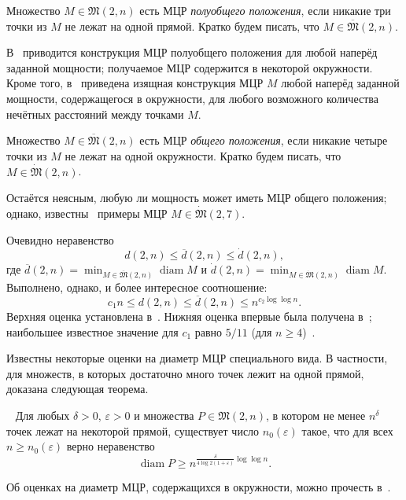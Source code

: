 \documentclass[11pt,twoside,draft
]{article}
\begin{document}
\begin{definition}
	Множество $M\in\mathfrak{M}(2,n)$ есть МЦР \textit{полуобщего положения},
	если никакие три точки из $M$ не лежат на одной прямой.
	Кратко будем писать, что $M\in \overline{\mathfrak{M}}(2,n)$.
\end{definition}

В~\cite{harborth1993upper} приводится конструкция МЦР полуобщего положения для любой наперёд заданной мощности;
получаемое МЦР содержится в некоторой окружности.
Кроме того, в~\cite{piepmeyer1996maximum} приведена изящная конструкция МЦР $M$ любой наперёд заданной мощности,
содержащегося в окружности,
для любого возможного количества нечётных расстояний между точками $M$.

\begin{definition}
	Множество $M\in\overline{\mathfrak{M}}(2,n)$ есть МЦР \textit{общего положения},
	если никакие четыре точки из $M$ не лежат на одной окружности.
	Кратко будем писать, что $M\in \dot{\mathfrak{M}}(2,n)$.
\end{definition}

Остаётся неясным, любую ли мощность может иметь МЦР общего положения;
однако, известны~\cite{kreisel2008heptagon,kurz2013constructing} примеры МЦР $M\in \dot{\mathfrak{M}}(2,7)$.

Очевидно неравенство
\begin{equation*}
	d(2,n) \leq \overline{d}(2,n) \leq \dot{d}(2,n)
	,
\end{equation*}
где
$
	\overline{d}(2,n) = \min_{M\in\overline{\mathfrak{M}}(2,n)} \operatorname{diam} M
$
и
$
	\dot{d}(2,n) = \min_{M\in\dot{\mathfrak{M}}(2,n)} \operatorname{diam} M
$.
Выполнено, однако, и более интересное соотношение:
\begin{equation*}
	c_1 n \leq d(2,n) \leq \overline{d}(2,n) \leq n^{c_2 \log \log n}
	.
\end{equation*}
Верхняя оценка установлена в~\cite{harborth1993upper}.
Нижняя оценка впервые была получена в~\cite{solymosi2003note};
наибольшее известное значение для $c_1$ равно $5/11$ (для $n\geq 4$)~\cite{my-pps-linear-bound-2019}.

Известны некоторые оценки на диаметр МЦР специального вида.
В частности, для множеств, в которых достаточно много точек лежит на одной прямой,
доказана следующая теорема.
\begin{theorem}~\cite[теорема 4]{kurz2008minimum}
	Для любых $\delta > 0$, $\varepsilon > 0$ и множества $P\in\mathfrak{M}(2,n)$,
	в котором не менее $n^\delta$ точек лежат на некоторой прямой, существует число $n_0 (\varepsilon)$
	такое, что для всех $n \geq n_0 (\varepsilon)$ верно неравенство
	\begin{equation}
		\operatorname{diam} P \geq n^{\frac{\delta}{4 \log 2(1+\varepsilon)}\log \log n}
		.
	\end{equation}
\end{theorem}
Об оценках на диаметр МЦР,
содержащихся в окружности, можно прочесть в~\cite{bat2018number}.
\end{document}
